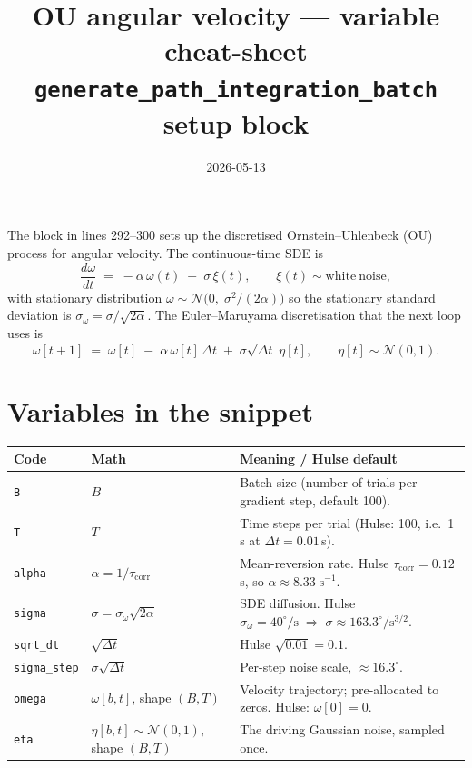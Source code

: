 \documentclass[11pt]{article}
\title{OU angular velocity --- variable cheat-sheet\\
\large \texttt{generate\_path\_integration\_batch} setup block}
\date{2026-05-13}
\begin{document}
\maketitle

The block in lines 292--300 sets up the discretised
Ornstein--Uhlenbeck (OU) process for angular velocity. The
continuous-time SDE is
\begin{equation}
\frac{d\omega}{dt} \;=\; -\alpha\,\omega(t) \;+\; \sigma\,\xi(t),
\qquad \xi(t)\sim\mathrm{white\ noise},
\label{eq:ou}
\end{equation}
with stationary distribution
$\omega\sim\mathcal{N}\bigl(0,\;\sigma^{2}/(2\alpha)\bigr)$ so the
stationary standard deviation is
$\sigma_{\omega}=\sigma/\sqrt{2\alpha}$. The Euler--Maruyama
discretisation that the next loop uses is
\begin{equation}
\omega[t+1] \;=\; \omega[t]
    \;-\;\alpha\,\omega[t]\,\Delta t
    \;+\;\sigma\sqrt{\Delta t}\;\eta[t],
\qquad \eta[t]\sim\mathcal{N}(0,1).
\label{eq:ou-discrete}
\end{equation}

\section*{Variables in the snippet}

\begin{center}\small
\begin{tabular}{lll}
\toprule
\textbf{Code} & \textbf{Math} & \textbf{Meaning / Hulse default} \\
\midrule
\texttt{B}             & $B$                       & Batch size (number of trials per gradient step, default 100). \\
\texttt{T}             & $T$                       & Time steps per trial (Hulse: 100, i.e.\ 1\,s at $\Delta t=0.01$\,s). \\
\texttt{alpha}         & $\alpha = 1/\tau_{\mathrm{corr}}$ & Mean-reversion rate. Hulse $\tau_{\mathrm{corr}}=0.12$\,s, so $\alpha\approx 8.33\;\mathrm{s}^{-1}$. \\
\texttt{sigma}         & $\sigma = \sigma_{\omega}\sqrt{2\alpha}$ & SDE diffusion. Hulse $\sigma_{\omega}=40^{\circ}/\mathrm{s}\;\Rightarrow\;\sigma\approx 163.3^{\circ}/\mathrm{s}^{3/2}$. \\
\texttt{sqrt\_dt}      & $\sqrt{\Delta t}$         & Hulse $\sqrt{0.01}=0.1$. \\
\texttt{sigma\_step}   & $\sigma\sqrt{\Delta t}$   & Per-step noise scale, $\approx 16.3^{\circ}$. \\
\texttt{omega}         & $\omega[b,t]$, shape $(B,T)$ & Velocity trajectory; pre-allocated to zeros. Hulse: $\omega[0]=0$. \\
\texttt{eta}           & $\eta[b,t]\sim\mathcal{N}(0,1)$, shape $(B,T)$ & The driving Gaussian noise, sampled once. \\
\bottomrule
\end{tabular}
\end{center}
\end{document}

